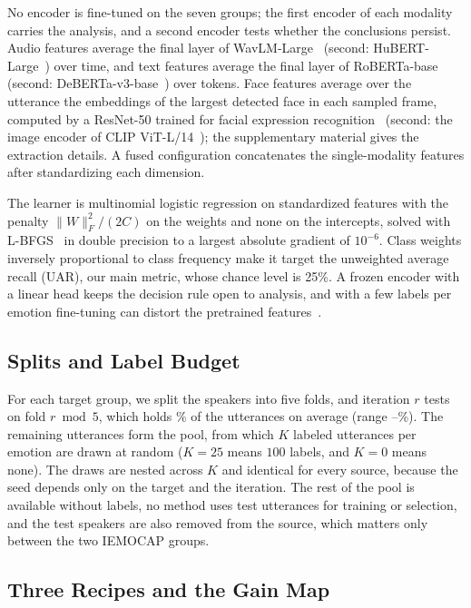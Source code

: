 No encoder is fine-tuned on the seven groups; the first encoder of each modality carries the analysis, and a second encoder tests whether the conclusions persist.
Audio features average the final layer of WavLM-Large~\cite{chen2022wavlm} (second: HuBERT-Large~\cite{hsu2021hubert}) over time, and text features average the final layer of RoBERTa-base~\cite{liu2019roberta} (second: DeBERTa-v3-base~\cite{he2023debertav3}) over tokens.
Face features average over the utterance the embeddings of the largest detected face in each sampled frame, computed by a ResNet-50 trained for facial expression recognition~\cite{ryumina2022facial} (second: the image encoder of CLIP ViT-L/14~\cite{radford2021clip}); the supplementary material gives the extraction details.
A fused configuration concatenates the single-modality features after standardizing each dimension.

The learner is multinomial logistic regression on standardized features with the penalty $\|W\|_F^2/(2C)$ on the weights and none on the intercepts, solved with L-BFGS~\cite{liu1989lbfgs} in double precision to a largest absolute gradient of $10^{-6}$.
Class weights inversely proportional to class frequency make it target the unweighted average recall (UAR), our main metric, whose chance level is 25\%.
A frozen encoder with a linear head keeps the decision rule open to analysis, and with a few labels per emotion fine-tuning can distort the pretrained features~\cite{kumar2022lpft}.

\subsection{Splits and Label Budget}
\label{sec:setting-splits}

For each target group, we split the speakers into five folds, and iteration $r$ tests on fold $r \bmod 5$, which holds \% of the utterances on average (range --\%).
The remaining utterances form the pool, from which $K$ labeled utterances per emotion are drawn at random ($K=25$ means $100$ labels, and $K=0$ means none).
The draws are nested across $K$ and identical for every source, because the seed depends only on the target and the iteration.
The rest of the pool is available without labels, no method uses test utterances for training or selection, and the test speakers are also removed from the source, which matters only between the two IEMOCAP groups.

\subsection{Three Recipes and the Gain Map}
\label{sec:setting-map}

